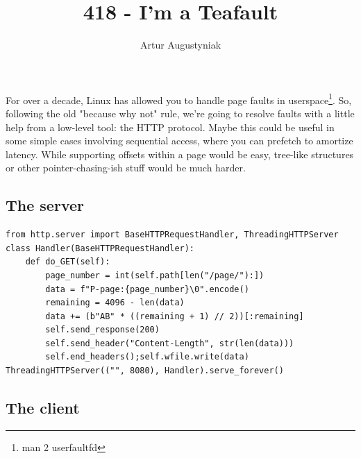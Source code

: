 \documentclass[twocolumn,9pt]{extarticle}
\title{418 - I'm a Teafault}
\author{Artur Augustyniak}
\makeatletter
\renewcommand{\maketitle}{
\begin{flushleft}
{\noindent\Huge\bf\@title}\break

\end{flushleft}
}
\makeatother
\begin{document}
\maketitle

For over a decade, Linux has allowed you to handle page faults in userspace\footnote{man 2 userfaultfd}. So, following the old "because why not" rule, we're going to resolve faults with a little help from a low-level tool: the HTTP protocol.
Maybe this could be useful in some simple cases involving sequential access, where you can prefetch to amortize latency. While supporting offsets within a page would be easy, tree-like structures or other pointer-chasing-ish stuff would be much harder.


\vspace{-9pt}
\subsection*{The server}
\vspace{-6pt}
\begin{lstlisting}
from http.server import BaseHTTPRequestHandler, ThreadingHTTPServer
class Handler(BaseHTTPRequestHandler):
    def do_GET(self):
        page_number = int(self.path[len("/page/"):])
        data = f"P-page:{page_number}\0".encode()
        remaining = 4096 - len(data)
        data += (b"AB" * ((remaining + 1) // 2))[:remaining]
        self.send_response(200)
        self.send_header("Content-Length", str(len(data)))
        self.end_headers();self.wfile.write(data)
ThreadingHTTPServer(("", 8080), Handler).serve_forever()
\end{lstlisting}
\vspace{-9pt}
\subsection*{The client}
\vspace{-6pt}
\end{document}
